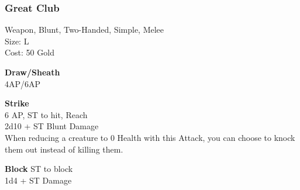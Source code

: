 \subsubsection{Great Club}\label{weapon:greatClub}
Weapon, Blunt, Two-Handed, Simple, Melee\\
Size: L\\
Cost: 50 Gold

\textbf{Draw/Sheath}\\
4AP/6AP

\textbf{Strike} \\
6 AP, ST to hit,  Reach\\
2d10 + \texttimes ST Blunt Damage\\
When reducing a creature to 0 Health with this Attack, you can choose to knock them out instead of killing them.

\textbf{Block}
ST to block\\
1d4 + \texttimes ST Damage

